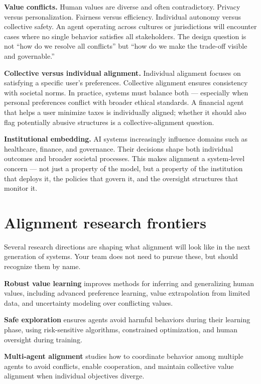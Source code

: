 \textbf{Value conflicts.} Human values are diverse and often contradictory. Privacy versus personalization. Fairness versus efficiency. Individual autonomy versus collective safety. An agent operating across cultures or jurisdictions will encounter cases where no single behavior satisfies all stakeholders. The design question is not ``how do we resolve all conflicts'' but ``how do we make the trade-off visible and governable.''

\textbf{Collective versus individual alignment.} Individual alignment focuses on satisfying a specific user's preferences. Collective alignment ensures consistency with societal norms. In practice, systems must balance both --- especially when personal preferences conflict with broader ethical standards. A financial agent that helps a user minimize taxes is individually aligned; whether it should also flag potentially abusive structures is a collective-alignment question.

\textbf{Institutional embedding.} AI systems increasingly influence domains such as healthcare, finance, and governance. Their decisions shape both individual outcomes and broader societal processes. This makes alignment a system-level concern --- not just a property of the model, but a property of the institution that deploys it, the policies that govern it, and the oversight structures that monitor it.

\section{Alignment research frontiers}

Several research directions are shaping what alignment will look like in the next generation of systems. Your team does not need to pursue these, but should recognize them by name.

\textbf{Robust value learning} improves methods for inferring and generalizing human values, including advanced preference learning, value extrapolation from limited data, and uncertainty modeling over conflicting values.

\textbf{Safe exploration} ensures agents avoid harmful behaviors during their learning phase, using risk-sensitive algorithms, constrained optimization, and human oversight during training.

\textbf{Multi-agent alignment} studies how to coordinate behavior among multiple agents to avoid conflicts, enable cooperation, and maintain collective value alignment when individual objectives diverge.

